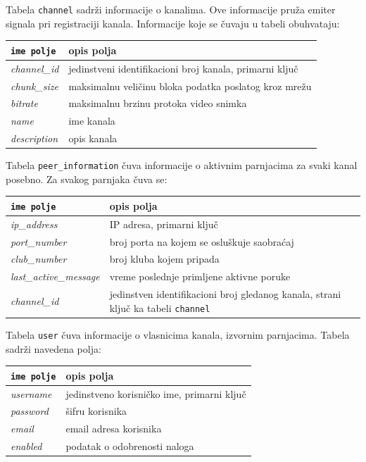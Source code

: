 \documentclass[12pt,oneside]{memoir}
\begin{document}
Tabela \texttt{channel} sadrži informacije o kanalima. Ove informacije pruža emiter signala pri registraciji kanala. Informacije koje se čuvaju u tabeli obuhvataju:

\begin{center}
\begin{tabular}{ |p{3.8cm}|p{10.2cm}| }
 \hline
 \texttt{ime polje} & opis polja \\ 
 \hline
 \textit{channel\_id} & jedinstveni identifikacioni broj kanala, primarni ključ \\ 
 \hline 
 \textit{chunk\_size} & maksimalnu veličinu bloka podatka poslatog kroz mrežu \\  
 \hline 
 \textit{bitrate} & maksimalnu brzinu protoka video snimka \\
 \hline 
 \textit{name} & ime kanala \\
 \hline 
 \textit{description} & opis kanala \\
 \hline
\end{tabular}
\end{center}


Tabela \texttt{peer\_information} čuva informacije o aktivnim parnjacima za svaki kanal posebno. Za svakog parnjaka čuva se:

\begin{center}
\begin{tabular}{ |p{3.8cm}|p{10.2cm}| }
 \hline
 \texttt{ime polje} & opis polja \\ 
 \hline
 \textit{ip\_address} & IP adresa, primarni ključ \\ 
 \hline
 \textit{port\_number} & broj porta na kojem se osluškuje saobraćaj \\  
 \hline
 \textit{club\_number} & broj kluba kojem pripada \\
 \hline
 \textit{last\_active\_message} & vreme poslednje primljene aktivne poruke \\
 \hline
 \textit{channel\_id} & jedinstven identifikacioni broj gledanog kanala, strani ključ ka tabeli \texttt{channel} \\
 \hline
\end{tabular}
\end{center}


Tabela \texttt{user} čuva informacije o vlasnicima kanala, izvornim parnjacima. Tabela sadrži navedena polja:

\begin{center}
\begin{tabular}{ |p{3.8cm}|p{10.2cm}| }
 \hline
 \texttt{ime polje} & opis polja \\ 
 \hline
 \textit{username} & jedinstveno korisničko ime, primarni ključ \\ 
 \hline
 \textit{password} & šifru korisnika \\  
 \hline
 \textit{email} & email adresa korisnika \\
 \hline
 \textit{enabled} & podatak o odobrenosti naloga \\
 \hline
\end{tabular}
\end{center}
\end{document}
